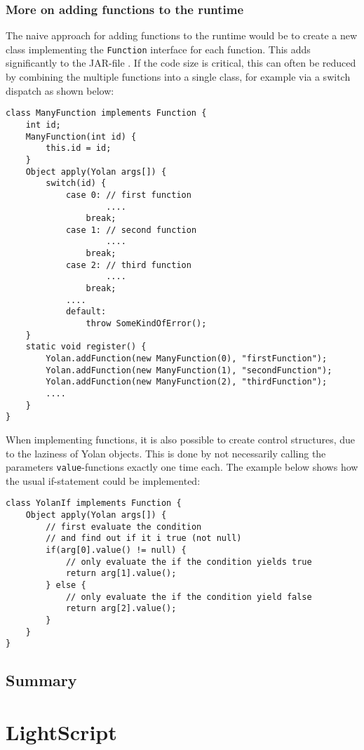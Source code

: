 \documentclass[11pt]{report}
\begin{document}
\subsection{More on adding functions to the runtime}
The naive approach for adding functions to the runtime would be to create a new class implementing the \verb|Function| interface for each function. This adds significantly to the JAR-file
.
If the code size is critical, this can often be reduced by combining the multiple functions into a single class, for example via a switch dispatch as shown below:
\begin{lstlisting}
class ManyFunction implements Function {
    int id;
    ManyFunction(int id) {
        this.id = id;
    }
    Object apply(Yolan args[]) {
        switch(id) {
            case 0: // first function
                    ....
                break;
            case 1: // second function
                    ....
                break;
            case 2: // third function
                    ....
                break;
            ....
            default:
                throw SomeKindOfError();
    }
    static void register() {
        Yolan.addFunction(new ManyFunction(0), "firstFunction");
        Yolan.addFunction(new ManyFunction(1), "secondFunction");
        Yolan.addFunction(new ManyFunction(2), "thirdFunction");
        ....
    }
}
\end{lstlisting}

When implementing functions, it is also possible to create control structures, due to the laziness of Yolan objects. This is done by not necessarily calling the parameters \verb|value|-functions exactly one time each. The example below shows how the usual if-statement could be implemented:
\begin{lstlisting}
class YolanIf implements Function {
    Object apply(Yolan args[]) {
        // first evaluate the condition
        // and find out if it i true (not null)
        if(arg[0].value() != null) {
            // only evaluate the if the condition yields true
            return arg[1].value();
        } else {
            // only evaluate the if the condition yield false
            return arg[2].value();
        }
    }
}
\end{lstlisting}

\section{Summary}
\chapter{LightScript}
\label{lightscript}
\end{document}
